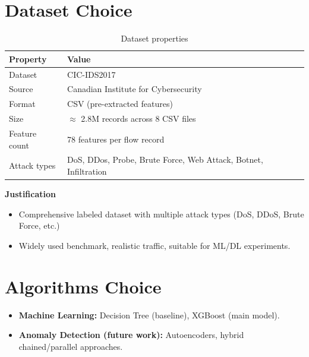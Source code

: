 \documentclass[12pt,a4paper]{article}
\begin{document}
\section{Dataset Choice}
\begin{table}[h!]
  \begin{center}
    \begin{tabularx}{\textwidth}{|l|X|}
      \hline
      \textbf{Property} & \textbf{Value}                                                  \\
      \hline
      Dataset           & CIC-IDS2017                                                     \\
      \hline
      Source            & Canadian Institute for Cybersecurity                            \\
      \hline
      Format            & CSV (pre-extracted features)                                    \\
      \hline
      Size              & $\approx$ 2.8M records across 8 CSV files                       \\
      \hline
      Feature count     & 78 features per flow record                                     \\
      \hline
      Attack types      & DoS, DDos, Probe, Brute Force, Web Attack, Botnet, Infiltration \\
      \hline
    \end{tabularx}
    \caption{Dataset properties}
    \label{tab1}
  \end{center}
\end{table}

\textbf{Justification }
\begin{itemize}
  \item Comprehensive labeled dataset with multiple attack types (DoS, DDoS, Brute Force, etc.)
  \item Widely used benchmark, realistic traffic, suitable for ML/DL experiments.
\end{itemize}


\section{Algorithms Choice}
\begin{itemize}
  \item \textbf{Machine Learning:} Decision Tree (baseline), XGBoost (main model).
  \item \textbf{Anomaly Detection (future work):} Autoencoders, hybrid chained/parallel approaches.
\end{itemize}
\end{document}
